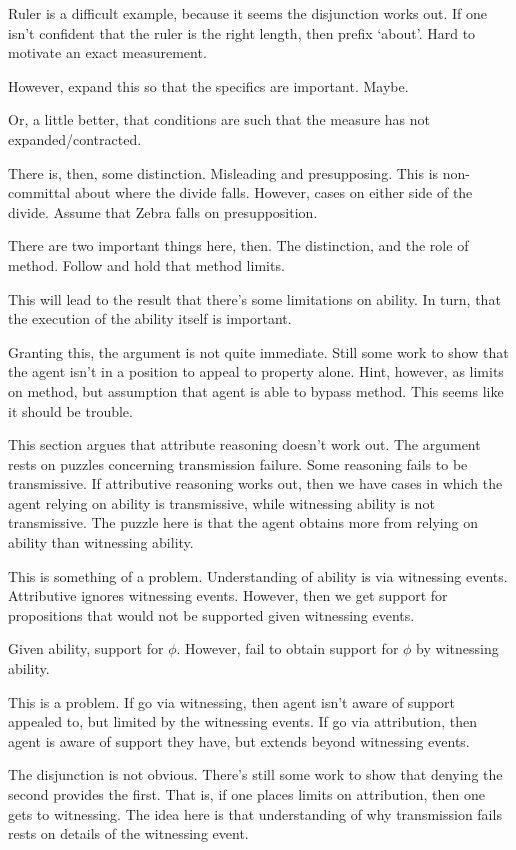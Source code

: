 \documentclass[10pt]{article}
\begin{document}
\begin{note}
  Ruler is a difficult example, because it seems the disjunction works out.
  If one isn't confident that the ruler is the right length, then prefix `about'.
  Hard to motivate an exact measurement.

  However, expand this so that the specifics are important.
  Maybe.

  Or, a little better, that conditions are such that the measure has not expanded/contracted.
\end{note}

There is, then, some distinction.
Misleading and presupposing.
This is non-committal about where the divide falls.
However, cases on either side of the divide.
Assume that Zebra falls on presupposition.

There are two important things here, then.
The distinction, and the role of method.
Follow \citeauthor{Wright:2016wl} and hold that method limits.


This will lead to the result that there's some limitations on ability.
In turn, that the execution of the ability itself is important.

Granting this, the argument is not quite immediate.
Still some work to show that the agent isn't in a position to appeal to property alone.
Hint, however, as limits on method, but assumption that agent is able to bypass method.
This seems like it should be trouble.


\begin{note}[Something]
  This section argues that attribute reasoning doesn't work out.
  The argument rests on puzzles concerning transmission failure.
  Some reasoning fails to be transmissive.
  If attributive reasoning works out, then we have cases in which the agent relying on ability is transmissive, while witnessing ability is not transmissive.
  The puzzle here is that the agent obtains more from relying on ability than witnessing ability.

  This is something of a problem.
  Understanding of ability is via witnessing events.
  Attributive ignores witnessing events.
  However, then we get support for propositions that would not be supported given witnessing events.

  Given ability, support for \(\phi\).
  However, fail to obtain support for \(\phi\) by witnessing ability.

  This is a problem.
  If go via witnessing, then agent isn't aware of support appealed to, but limited by the witnessing events.
  If go via attribution, then agent is aware of support they have, but extends beyond witnessing events.

  The disjunction is not obvious.
  There's still some work to show that denying the second provides the first.
  That is, if one places limits on attribution, then one gets to witnessing.
  The idea here is that understanding of why transmission fails rests on details of the witnessing event.

  
\end{note}
\end{document}
